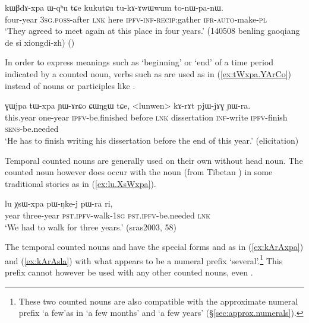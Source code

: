 \begin{exe}
\ex \label{ex:kWBdexpa.Wqhu}
\gll  kɯβdɤ-xpa ɯ-qʰu tɕe kukutɕu tu-kɤ-ɤwɯwum to-nɯ-pa-nɯ. \\
four-year \textsc{3sg}.\textsc{poss}-after \textsc{lnk} here \textsc{ipfv}-\textsc{inf}-\textsc{recip}:gather \textsc{ifr}-\textsc{auto}-make-\textsc{pl} \\
\glt `They agreed to meet again at this place in four years.' (140508 benling gaoqiang de si xiongdi-zh)
()
\end{exe} 

In order to express meanings such as `beginning' or `end' of a time period indicated by a counted noun, verbs such as  are used as in (\ref{ex:tWxpa.YArCo}) instead of nouns or participles like .

\begin{exe}
\ex \label{ex:tWxpa.YArCo}
\gll ɣɯjpa tɯ-xpa ɲɯ-ɤrɕo ɕɯŋgɯ tɕe, <lunwen> kɤ-rɤt pjɯ-jɤɣ ɲɯ-ra. \\
this.year one-year \textsc{ipfv}-be.finished  before \textsc{lnk} dissertation \textsc{inf}-write \textsc{ipfv}-finish \textsc{sens}-be.needed \\
\glt `He has to finish writing his dissertation before the end of this year.' (elicitation)
\end{exe} 

Temporal counted nouns are generally used on their own without head noun. The counted noun  however does occur with the noun  (from Tibetan ) in some traditional stories as in (\ref{ex:lu.XsWxpa}).

\begin{exe}
\ex \label{ex:lu.XsWxpa}
\gll lu χsɯ-xpa pɯ-ŋke-j pɯ-ra ri, \\
year three-year \textsc{pst}.\textsc{ipfv}-walk-\textsc{1sg} \textsc{pst}.\textsc{ipfv}-be.needed \textsc{lnk} \\
\glt `We had to walk for three years.' (sras2003, 58)
\end{exe} 

The temporal counted nouns  and  have the special forms  and  as in (\ref{ex:kArAxpa}) and (\ref{ex:kArAsla}) with what appears to be a numeral prefix  `several'.\footnote{These two counted nouns are also compatible with the approximate numeral prefix  `a few'as in  `a few months' and  `a few years' (§\ref{sec:approx.numerals}).
} This prefix cannot however be used with any other counted nouns, even . 


